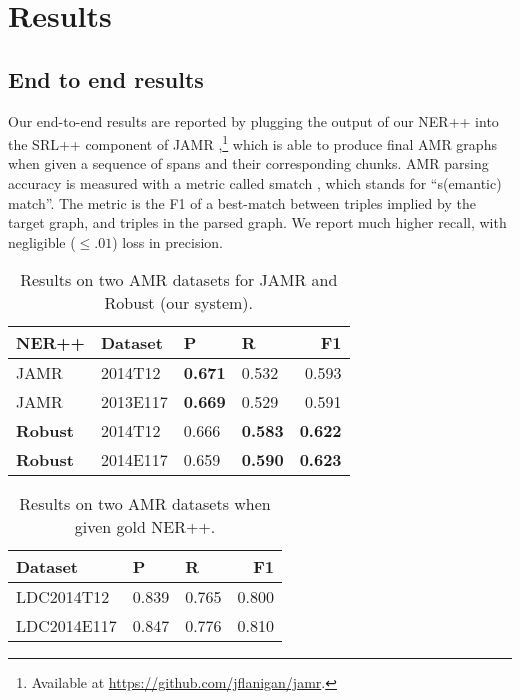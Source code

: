 \documentclass[11pt]{article}
\begin{document}


\section{Results}

\subsection{End to end results}

Our end-to-end results are reported by plugging the output of our NER++ into the SRL++ component of JAMR \cite{2014flanigan-amr},\footnote
  {Available at \url{https://github.com/jflanigan/jamr}.}
which is able to produce final AMR graphs when given a sequence of spans and their corresponding chunks. AMR parsing accuracy is measured with a metric called smatch \needcite, which stands for ``s(emantic) match''. The metric is the F1 of a best-match between triples implied by the target graph, and triples in the parsed graph. We report much higher recall, with negligible ($\leq .01$) loss in precision.

\begin{table}[h]
\begin{center}
\begin{tabular}{|l|l|llr|}
\hline NER++ & Dataset & P & R & F1 \\ \hline
JAMR & 2014T12 & \textbf{0.671} & 0.532 & 0.593 \\
JAMR & 2013E117 & \textbf{0.669} & 0.529 & 0.591 \\
\textbf{Robust} & 2014T12 & 0.666 & \textbf{0.583} & \textbf{0.622} \\
\bf Robust & 2014E117 & 0.659 & \textbf{0.590} & \textbf{0.623} \\
\hline
\end{tabular}
\end{center}
\caption{\label{font-table} Results on two AMR datasets for JAMR \cite{2014flanigan-amr} and Robust (our system).}
\end{table}


\begin{table}[h]
\begin{center}
\begin{tabular}{|l|llr|}
\hline Dataset & P & R & F1 \\ \hline
LDC2014T12 & 0.839 & 0.765 & 0.800 \\
LDC2014E117 & 0.847 & 0.776 & 0.810 \\
\hline
\end{tabular}
\end{center}
\caption{\label{font-table} Results on two AMR datasets when given gold NER++. }
\end{table}
\end{document}
